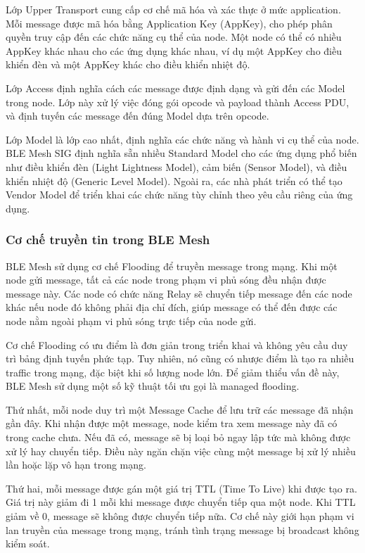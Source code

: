Lớp Upper Transport cung cấp cơ chế mã hóa và xác thực ở mức application. Mỗi message được mã hóa bằng Application Key (AppKey), cho phép phân quyền truy cập đến các chức năng cụ thể của node. Một node có thể có nhiều AppKey khác nhau cho các ứng dụng khác nhau, ví dụ một AppKey cho điều khiển đèn và một AppKey khác cho điều khiển nhiệt độ.

Lớp Access định nghĩa cách các message được định dạng và gửi đến các Model trong node. Lớp này xử lý việc đóng gói opcode và payload thành Access PDU, và định tuyến các message đến đúng Model dựa trên opcode.

Lớp Model là lớp cao nhất, định nghĩa các chức năng và hành vi cụ thể của node. BLE Mesh SIG định nghĩa sẵn nhiều Standard Model cho các ứng dụng phổ biến như điều khiển đèn (Light Lightness Model), cảm biến (Sensor Model), và điều khiển nhiệt độ (Generic Level Model). Ngoài ra, các nhà phát triển có thể tạo Vendor Model để triển khai các chức năng tùy chỉnh theo yêu cầu riêng của ứng dụng.



\subsubsection{Cơ chế truyền tin trong BLE Mesh}

BLE Mesh sử dụng cơ chế Flooding để truyền message trong mạng. Khi một node gửi message, tất cả các node trong phạm vi phủ sóng đều nhận được message này. Các node có chức năng Relay sẽ chuyển tiếp message đến các node khác nếu node đó không phải địa chỉ đích, giúp message có thể đến được các node nằm ngoài phạm vi phủ sóng trực tiếp của node gửi.

Cơ chế Flooding có ưu điểm là đơn giản trong triển khai và không yêu cầu duy trì bảng định tuyến phức tạp. Tuy nhiên, nó cũng có nhược điểm là tạo ra nhiều traffic trong mạng, đặc biệt khi số lượng node lớn. Để giảm thiểu vấn đề này, BLE Mesh sử dụng một số kỹ thuật tối ưu gọi là managed flooding.

Thứ nhất, mỗi node duy trì một Message Cache để lưu trữ các message đã nhận gần đây. Khi nhận được một message, node kiểm tra xem message này đã có trong cache chưa. Nếu đã có, message sẽ bị loại bỏ ngay lập tức mà không được xử lý hay chuyển tiếp. Điều này ngăn chặn việc cùng một message bị xử lý nhiều lần hoặc lặp vô hạn trong mạng.

Thứ hai, mỗi message được gán một giá trị TTL (Time To Live) khi được tạo ra. Giá trị này giảm đi 1 mỗi khi message được chuyển tiếp qua một node. Khi TTL giảm về 0, message sẽ không được chuyển tiếp nữa. Cơ chế này giới hạn phạm vi lan truyền của message trong mạng, tránh tình trạng message bị broadcast không kiểm soát.


